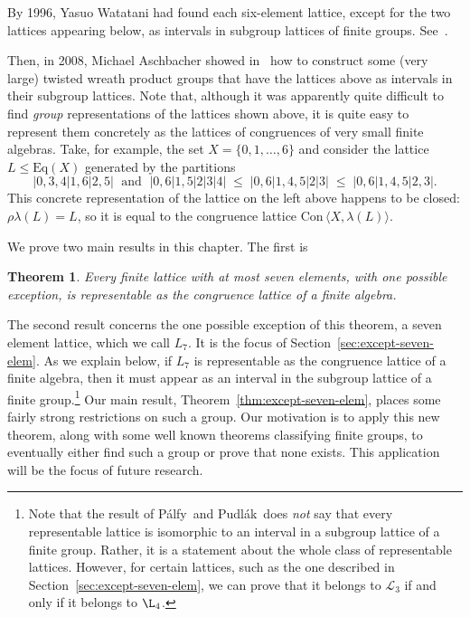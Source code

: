 \documentclass[cm,dissertation]{uhthesis}
\theoremstyle{plain}
\newtheorem{theorem}{Theorem}[section]
\theoremstyle{definition}
\theoremstyle{remark}
\numberwithin{theorem}{section}
\numberwithin{claim}{chapter}
\numberwithin{equation}{section}
\numberwithin{conjecture}{chapter}
\newcommand{\Palfy}{P\'alfy}
\newcommand{\Pudlak}{Pudl\'ak}
\newcommand{\<}{\ensuremath{\langle}}
\renewcommand{\>}{\ensuremath{\rangle}}
\renewcommand{\leq}{\ensuremath{\leqslant}}
\newcommand{\Eq}{\ensuremath{\mathrm{Eq}}}
\newcommand{\Con}{\ensuremath{\mathrm{Con\,}}}
\newcommand{\0}{\ensuremath{\mathbf{0}}}
\newcommand{\1}{\ensuremath{\mathbf{1}}}
\newcommand{\2}{\ensuremath{\mathbf{2}}}
\newcommand{\3}{\ensuremath{\mathbf{3}}}
\newcommand{\4}{\ensuremath{\mathbf{4}}}
\newcommand{\5}{\ensuremath{\mathbf{5}}}
\newcommand{\sL}{\ensuremath{\mathscr{L}}}
\begin{document}
%
By 1996, Yasuo Watatani had found each six-element lattice, except for the
two lattices appearing below, as intervals in subgroup lattices of finite
groups.  
See~\cite{Watatani:1996}.
\begin{multicols}{2}
\hskip4cm
  \begin{tikzpicture}[scale=.5]
    
  \end{tikzpicture}
  \par \vfill \columnbreak
  \begin{tikzpicture}[scale=.6]
    
  \end{tikzpicture}
\end{multicols}
%
Then, in 2008, Michael Aschbacher
showed in~\cite{Aschbacher:2008} how to construct some (very large) twisted wreath product 
groups that have the lattices above as intervals in their subgroup lattices.
Note that, although it was apparently quite difficult to find \emph{group}
representations of the lattices shown above, it is quite easy to
represent them concretely as the lattices of congruences of very small finite
algebras.  Take, for example, the set $X=\{0,1,\dots, 6\}$ and consider the
lattice $L\leq \Eq(X)$ generated by the partitions
  \[
|0,3,4|1,6|2,5| \; \text{ and } \;  |0,6|1,5|2|3|4|  \; \leq \; |0,6|1,4,5|2|3|\; \leq \;|0,6|1,4,5|2,3|.
  \]
This concrete representation of the lattice on the left above happens to be closed:
$\rho \lambda(L) = L$, so it is equal to the congruence lattice $\Con\<X, \lambda(L)\>$.  

We prove two main results in this chapter.  The first is
\begin{theorem}
\label{thm:sevenelementlattices}
  Every finite lattice with at most seven elements, with one possible exception,
  is representable as the congruence lattice of a finite algebra.
\end{theorem}
The second result concerns the one possible exception of this theorem, 
a seven element lattice, which we call $L_7$.  It is the focus of
Section~\ref{sec:except-seven-elem}.
As we explain below, 
if $L_7$ is representable as the congruence lattice of a finite
algebra, then it must appear as an interval in the subgroup lattice of a finite
group.\footnote{Note that the result of \Palfy\ and \Pudlak\ does \emph{not} say
  that every representable lattice is isomorphic to an interval in a subgroup
  lattice of a finite group.  Rather, it is a statement about the whole class of
  representable lattices.  However, for certain lattices, such as the one described
in Section~\ref{sec:except-seven-elem}, we can prove that it belongs to $\sL_3$ if and only if it belongs to $\L_4$.}
 Our main result, Theorem~\ref{thm:except-seven-elem}, places some fairly
strong restrictions on such a group.  Our motivation is to apply this
new theorem, along with some well known theorems classifying finite groups, to
eventually either find such a group or prove that none exists.  This application
will be the focus of future research.
\end{document}
